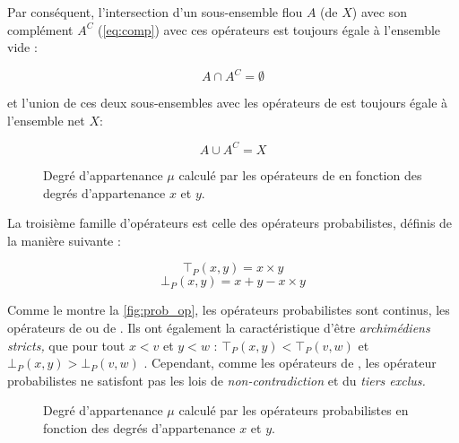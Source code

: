 Par conséquent, l'intersection d'un sous-ensemble flou \(A\) (de
\(X\)) avec son complément \(A^C\) (\autoref{eq:comp}) avec ces
opérateurs est toujours égale à l'ensemble vide :

\begin{equation}
  A \cap A^C = \emptyset
\end{equation}

et l'union de ces deux sous-ensembles avec les opérateurs de
 est toujours égale à l'ensemble net \(X\):
 
\begin{equation}
  A \cup A^C = X
\end{equation}

\begin{figure}
  \begin{center}
     
    \caption{Degré d'appartenance \(\mu\) calculé par les opérateurs
      de  en fonction des degrés d'appartenance \(x\)
      et \(y\).}
    \label{fig:luka_op}
  \end{center}
\end{figure}

La troisième famille d'opérateurs est celle des opérateurs
probabilistes, définis de la manière suivante :

\begin{equation}
  \label{eq:norm_proba}
  ⊤_P(x,y) = x×y
\end{equation}
%
\begin{equation}
  \label{eq:conorm_proba}
  ⊥_P(x,y) = x+y - x×y
\end{equation}

Comme le montre la \autoref{fig:prob_op}, les opérateurs probabilistes
sont continus, les opérateurs de \textcite{Zadeh1965} ou de
. Ils ont également la caractéristique d'être
\emph{archimédiens stricts,} \ie que pour tout \(x < v\) et \(y < w\)
: \(⊤_P(x,y) < ⊤_P(v,w)\) et \(⊥_P(x,y) > ⊥_P(v,w)\)
\autocite{Bouchon-Meunier1995}. Cependant, comme les opérateurs de
\textcite{Zadeh1965}, les opérateur probabilistes ne satisfont pas les
lois de \emph{non-contradiction} et du \emph{tiers exclus.}

\begin{figure}
  \begin{center}
     \hfill
    \caption{Degré d'appartenance \(\mu\) calculé par les opérateurs
      probabilistes en fonction des degrés d'appartenance \(x\) et
      \(y\).}
    \label{fig:prob_op}
  \end{center}
\end{figure}

